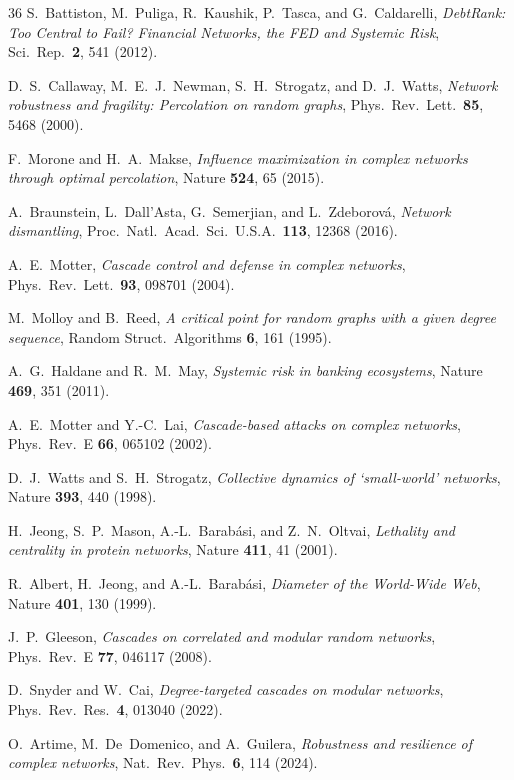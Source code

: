 \documentclass[aps,pre,twocolumn,superscriptaddress,showpacs]{revtex4-2}
\begin{document}
\begin{thebibliography}{36}
S.~Battiston, M.~Puliga, R.~Kaushik, P.~Tasca, and G.~Caldarelli,
\emph{DebtRank: Too Central to Fail? Financial Networks, the FED and Systemic Risk},
Sci.\ Rep.\ \textbf{2}, 541 (2012).

D.~S.~Callaway, M.~E.~J.~Newman, S.~H.~Strogatz, and D.~J.~Watts,
\emph{Network robustness and fragility: Percolation on random graphs},
Phys.\ Rev.\ Lett.\ \textbf{85}, 5468 (2000).

F.~Morone and H.~A.~Makse,
\emph{Influence maximization in complex networks through optimal percolation},
Nature \textbf{524}, 65 (2015).

A.~Braunstein, L.~Dall'Asta, G.~Semerjian, and L.~Zdeborov\'a,
\emph{Network dismantling},
Proc.\ Natl.\ Acad.\ Sci.\ U.S.A.\ \textbf{113}, 12368 (2016).

A.~E.~Motter,
\emph{Cascade control and defense in complex networks},
Phys.\ Rev.\ Lett.\ \textbf{93}, 098701 (2004).

M.~Molloy and B.~Reed,
\emph{A critical point for random graphs with a given degree sequence},
Random Struct.\ Algorithms \textbf{6}, 161 (1995).

A.~G.~Haldane and R.~M.~May,
\emph{Systemic risk in banking ecosystems},
Nature \textbf{469}, 351 (2011).

A.~E.~Motter and Y.-C.~Lai,
\emph{Cascade-based attacks on complex networks},
Phys.\ Rev.\ E \textbf{66}, 065102 (2002).

D.~J.~Watts and S.~H.~Strogatz,
\emph{Collective dynamics of `small-world' networks},
Nature \textbf{393}, 440 (1998).

H.~Jeong, S.~P.~Mason, A.-L.~Barab\'asi, and Z.~N.~Oltvai,
\emph{Lethality and centrality in protein networks},
Nature \textbf{411}, 41 (2001).

R.~Albert, H.~Jeong, and A.-L.~Barab\'asi,
\emph{Diameter of the World-Wide Web},
Nature \textbf{401}, 130 (1999).

J.~P.~Gleeson,
\emph{Cascades on correlated and modular random networks},
Phys.\ Rev.\ E \textbf{77}, 046117 (2008).

D.~Snyder and W.~Cai,
\emph{Degree-targeted cascades on modular networks},
Phys.\ Rev.\ Res.\ \textbf{4}, 013040 (2022).

O.~Artime, M.~De~Domenico, and A.~Guilera,
\emph{Robustness and resilience of complex networks},
Nat.\ Rev.\ Phys.\ \textbf{6}, 114 (2024).


\end{thebibliography}
\end{document}

